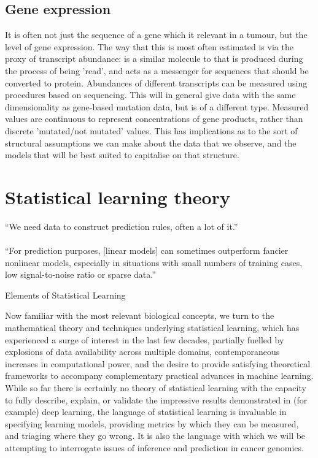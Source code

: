 \documentclass[thesis.tex]{subfiles}
\begin{document}
\subsection{Gene expression}
It is often not just the sequence of a gene which it relevant in a tumour, but the level of gene expression. The way that this is most often estimated is via the proxy of   transcript abundance:   is a similar molecule to  that is produced during the process of  being 'read', and acts as a messenger for sequences that should be converted to protein. Abundances of different   transcripts can be measured using procedures based on  sequencing. This will in general give data with the same dimensionality as gene-based mutation data, but is of a different type. Measured values are continuous to represent concentrations of gene products, rather than discrete 'mutated/not mutated' values. This has implications as to the sort of structural assumptions we can make about the data that we observe, and the models that will be best suited to capitalise on that structure.


\section{Statistical learning theory}
\epigraph{``We need data to construct prediction rules, often a lot of it.'' \\
~\\
``For prediction purposes, [linear models] can sometimes outperform fancier
nonlinear models, especially in situations with small numbers of training
cases, low signal-to-noise ratio or sparse data.''}{Elements of Statistical Learning \\
\citep{hastie_elements_2009}}

Now familiar with the most relevant biological concepts, we turn to the mathematical theory and techniques underlying statistical learning, which has experienced a surge of interest in the last few decades, partially fuelled by explosions of data availability across multiple domains, contemporaneous increases in computational power, and the desire to provide satisfying theoretical frameworks to accompany complementary practical advances in machine learning. While so far there is certainly no theory of statistical learning with the capacity to fully describe, explain, or validate the impressive results demonstrated in (for example) deep learning, the language of statistical learning is invaluable in specifying learning models, providing metrics by which they can be measured, and triaging where they go wrong. It is also the language with which we will be attempting to interrogate issues of inference and prediction in cancer genomics. 
\end{document}
